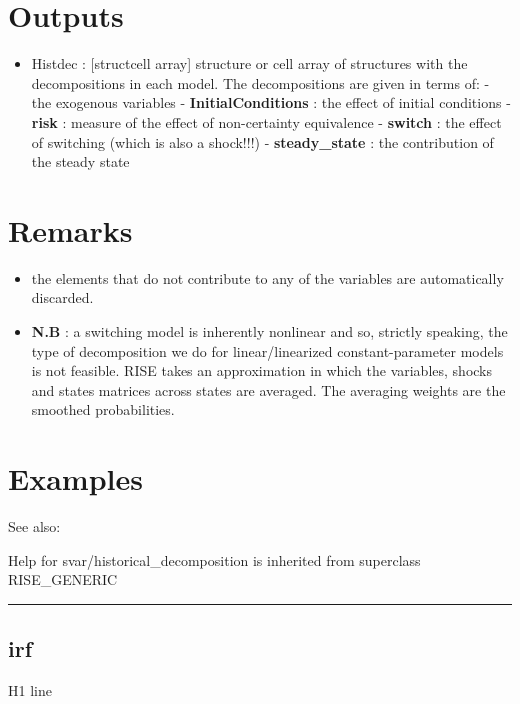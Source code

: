 \documentclass[letterpaper,10pt,english]{sphinxmanual}
\begin{document}
\section{Outputs}
\label{classes/models/@svar/svar:id28}\begin{itemize}
\item {} 
Histdec : {[}struct\textbar{}cell array{]} structure or cell array of structures
with the decompositions in each model. The decompositions are given in
terms of:
- the exogenous variables
- \textbf{InitialConditions} : the effect of initial conditions
- \textbf{risk} : measure of the effect of non-certainty equivalence
- \textbf{switch} : the effect of switching (which is also a shock!!!)
- \textbf{steady\_state} : the contribution of the steady state

\end{itemize}


\section{Remarks}
\label{classes/models/@svar/svar:remarks}\begin{itemize}
\item {} 
the elements that do not contribute to any of the variables are
automatically discarded.

\item {} 
\textbf{N.B} : a switching model is inherently nonlinear and so, strictly
speaking, the type of decomposition we do for linear/linearized
constant-parameter models is not feasible. RISE takes an approximation
in which the variables, shocks and states matrices across states are
averaged. The averaging weights are the smoothed probabilities.

\end{itemize}


\section{Examples}
\label{classes/models/@svar/svar:id29}
See also:

Help for svar/historical\_decomposition is inherited from superclass RISE\_GENERIC


\bigskip\hrule{}\bigskip



\subsection{irf}
\label{classes/models/@svar/svar:id30}\label{classes/models/@svar/svar:irf}
H1 line
\end{document}
